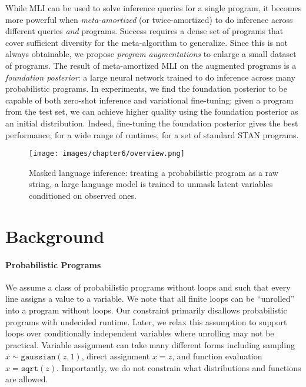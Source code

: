 While MLI can be used to solve inference queries for a single program, it becomes more powerful when \textit{meta-amortized} (or twice-amortized)  to do inference across different queries \textit{and} programs. Success requires a dense set of programs that cover sufficient diversity for the meta-algorithm to generalize. Since this is not always obtainable, we propose \textit{program augmentations} to enlarge a small dataset of programs. The result of meta-amortized MLI on the augmented programs is a \textit{foundation posterior}: a large neural network trained to do inference across many probabilistic programs. In experiments, we find the foundation posterior to be capable of both zero-shot inference and variational fine-tuning: given a program from the test set, we can achieve higher quality using the foundation posterior as an initial distribution. Indeed, fine-tuning the foundation posterior gives the best performance, for a wide range of runtimes, for a set of standard STAN programs.


\begin{figure}[tb]
    \centering
    \texttt{[image: images/chapter6/overview.png]}
    \caption{Masked language inference: treating a probabilistic program as a raw string, a large language model is trained to unmask latent variables conditioned on observed ones.}
    \label{fig:overview}
\end{figure}

\section{Background}
\label{sec:background}


\paragraph{Probabilistic Programs}
We assume a class of probabilistic programs without loops and such that every line assigns a value to a variable. We note that all finite loops can be ``unrolled'' into a program without loops. Our constraint primarily disallows probabilistic programs with undecided runtime. Later, we relax this assumption to support loops over conditionally independent variables where unrolling may not be practical.
Variable assignment can take many different forms including sampling $x \sim \texttt{gaussian}(z, 1)$, direct assignment $x = z$, and function evaluation $x = \texttt{sqrt}(z)$. Importantly, we do not constrain what distributions and functions are allowed.

